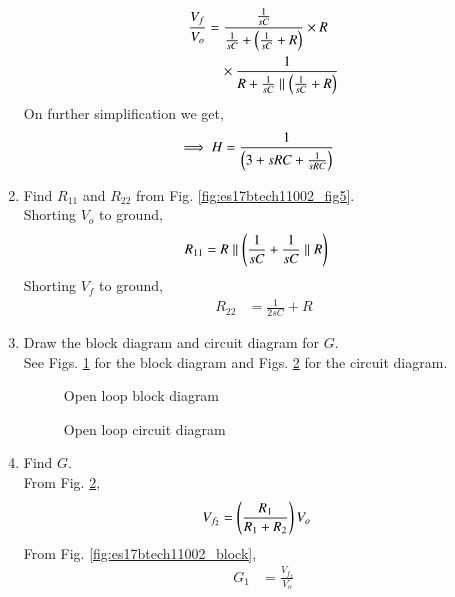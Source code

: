 \begin{enumerate}[label=\arabic*.,ref=\theenumi]
\begin{align}
\frac{V_{f}}{V_{o}} &=\frac{\frac{1}{sC}}{\frac{1}{sC} +  \left(\frac{1}{sC}+R\right)}\times R\\\
&\quad \times  \frac{1}{R + \frac{1}{sC} \parallel \left(\frac{1}{sC}+R\right)}
\end{align}
On further simplification we get,
\begin{align}
\implies H &= \frac{1}{\brak{3+sRC +\frac{1}{sRC}}}
\label{eq:es17btech11002_H}
\end{align}
%
\item Find $R_{11}$ and $R_{22}$ from Fig. \ref{fig:es17btech11002_fig5}. 
\\
\solution Shorting  $V_{o}$ to ground,
\begin{align}
R_{11} &= R\parallel \brak{\frac{1}{sC}+ \frac{1}{sC}\parallel R} 
\label{eq:es17btech11002_6}
\end{align}
Shorting $V_{f}$ to ground,
\begin{align}
R_{22} &= \frac{1}{2sC} + R  
\end{align}
\item Draw the block diagram and circuit diagram for $G$.\\
\solution See Figs. \ref{fig:es17btech11002_fig6} for the block diagram  and Figs. \ref{fig:es17btech11002_fig7} for the circuit diagram.
\numberwithin{figure}{enumi}
\renewcommand{\thefigure}{\theenumi.\arabic{figure}}
%
\begin{figure}[!ht]
	\begin{center}
		\resizebox{\columnwidth}{!}{}
	\end{center}
\caption{Open loop block diagram}
\label{fig:es17btech11002_fig6}
\end{figure}
%
\begin{figure}[!ht]
	\begin{center}
		\resizebox{\columnwidth}{!}{}
	\end{center}
\caption{Open loop circuit diagram}
\label{fig:es17btech11002_fig7}
\end{figure}
\renewcommand{\thefigure}{\theenumi}
%
\item Find $G$.
\\
\solution From Fig. \ref{fig:es17btech11002_fig7},
\begin{align}
V_{f_{2}} &= \left(\frac{R_{1}}{R_{1} + R_{2}}\right)V_{o}
\end{align}
From Fig. \ref{fig:es17btech11002_block},
%
\begin{align}
G_{1} &= \frac{V_{f_{2}}}{V_{o}}
\end{align}


\end{enumerate}
